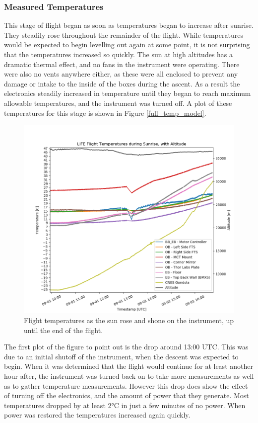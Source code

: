 \subsubsection{Measured Temperatures}
This stage of flight began as soon as temperatures began to increase after sunrise. They steadily rose throughout the remainder of the flight. While temperatures would be expected to begin levelling out again at some point, it is not surprising that the temperatures increased so quickly. The sun at high altitudes has a dramatic thermal effect, and no fans in the instrument were operating. There were also no vents anywhere either, as these were all enclosed to prevent any damage or intake to the inside of the boxes during the ascent. As a result the electronics steadily increased in temperature until they began to reach maximum allowable temperatures, and the instrument was turned off. A plot of these temperatures for this stage is shown in Figure \ref{full_temp_model}.

\begin{figure}
    \centering
    \includegraphics[width=\textwidth]{chap4_images/sunrise_images/sunrise_no_sim_temps.png}
    \caption{Flight temperatures as the sun rose and shone on the instrument, up until the end of the flight.}
    \label{fig:sunrise_temps_no_sims}
\end{figure}

The first plot of the figure to point out is the drop around 13:00 UTC. This was due to an initial shutoff of the instrument, when the descent was expected to begin. When it was determined that the flight would continue for at least another hour after, the instrument was turned back on to take more measurements as well as to gather temperature measurements. However this drop does show the effect of turning off the electronics, and the amount of power that they generate. Most temperatures dropped by at least 2°C in just a few minutes of no power. When power was restored the temperatures increased again quickly. 

